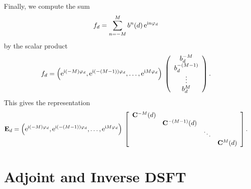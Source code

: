 Finally, we compute the sum
$$
  f_{d} = \sum_{n=-M}^M b^{n}{\hspace{-0.4ex}}\left(d\right) \mbox{\rm{e}}^{\mbox{\scriptsize\rm{i}} n \varphi_{d}}
$$
by the scalar product
$$
  f_{d} 
  = 
  \left(\mbox{\rm{e}}^{\mbox{\scriptsize\rm{i}} (-M) \varphi_{d}},\mbox{\rm{e}}^{\mbox{\scriptsize\rm{i}} (-(M-1)) \varphi_{d}},\ldots,\mbox{\rm{e}}^{\mbox{\scriptsize\rm{i}} M \varphi_{d}}\right)
  \:   
  \left(\begin{array}{c}
    b^{-M}_{d}\\
    b^{-(M-1)}_{d}\\
    \vdots\\
    b^{M}_{d}
  \end{array}\right).
$$
This gives the representation
$$
  \mathbf{E}_{d} = \left(\mbox{\rm{e}}^{\mbox{\scriptsize\rm{i}} (-M) \varphi_{d}},\mbox{\rm{e}}^{\mbox{\scriptsize\rm{i}} (-(M-1)) \varphi_{d}},\ldots,\mbox{\rm{e}}^{\mbox{\scriptsize\rm{i}} M \varphi_{d}}\right) \:  
  \left[\begin{array}{cccc}
    \mathbf{C}^{-M}{\hspace{-0.4ex}}\left(d\right) &                       &        &                    \\
                        & \mathbf{C}^{-(M-1)}{\hspace{-0.4ex}}\left(d\right) &        &                    \\
                        &                       & \ddots &                    \\
                        &                       &        & \mathbf{C}^{M}{\hspace{-0.4ex}}\left(d\right) 
  \end{array}\right].
$$

\section{Adjoint and Inverse DSFT}

